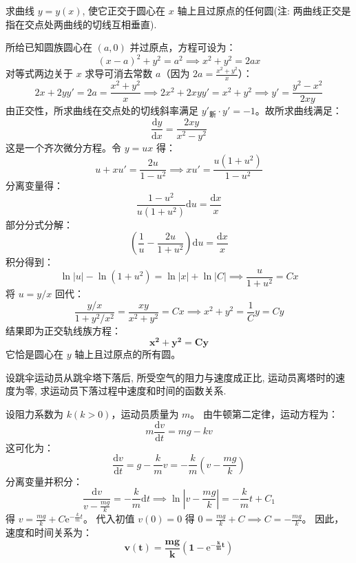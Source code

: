 \documentclass[lang=cn,11pt]{elegantbook}
\begin{document}
\begin{exercise}[求解曲线]
求曲线 $y=y(x)$, 使它正交于圆心在 $x$ 轴上且过原点的任何圆(注: 两曲线正交是指在交点处两曲线的切线互相垂直).
\end{exercise}
\begin{solution}
所给已知圆族圆心在 $(a,0)$ 并过原点，方程可设为：
\[
(x-a)^2 + y^2 = a^2 \implies x^2+y^2 = 2ax
\]
对等式两边关于 $x$ 求导可消去常数 $a$（因为 $2a = \frac{x^2+y^2}{x}$）：
\[
2x + 2yy' = 2a = \frac{x^2+y^2}{x} \implies 2x^2 + 2xyy' = x^2+y^2 \implies y' = \frac{y^2-x^2}{2xy}
\]
由正交性，所求曲线在交点处的切线斜率满足 $y'_{\text{新}} \cdot y' = -1$。故所求曲线满足：
\[
\frac{\mathrm{d}y}{\mathrm{d}x} = \frac{2xy}{x^2-y^2}
\]
这是一个齐次微分方程。令 $y = ux$ 得：
\[
u+xu' = \frac{2u}{1-u^2} \implies xu' = \frac{u(1+u^2)}{1-u^2}
\]
分离变量得：
\[
\frac{1-u^2}{u(1+u^2)}\mathrm{d}u = \frac{\mathrm{d}x}{x}
\]
部分分式分解：
\[
\left(\frac{1}{u} - \frac{2u}{1+u^2}\right)\mathrm{d}u = \frac{\mathrm{d}x}{x}
\]
积分得到：
\[
\ln|u| - \ln(1+u^2) = \ln|x| + \ln|C| \implies \frac{u}{1+u^2} = Cx
\]
将 $u=y/x$ 回代：
\[
\frac{y/x}{1+y^2/x^2} = \frac{xy}{x^2+y^2} = Cx \implies x^2+y^2 = \frac{1}{C}y = Cy
\]
结果即为正交轨线族方程：
\[
\mathbf{x^2+y^2=Cy}
\]
它恰是圆心在 $y$ 轴上且过原点的所有圆。
\end{solution}

\begin{exercise}[落体问题] 
    设跳伞运动员从跳伞塔下落后, 所受空气的阻力与速度成正比, 运动员离塔时的速度为零, 求运动员下落过程中速度和时间的函数关系.
\end{exercise}
\begin{solution}
设阻力系数为 $k(k>0)$，运动员质量为 $m$。
由牛顿第二定律，运动方程为：
\[
m\frac{\mathrm{d}v}{\mathrm{d}t} = mg - kv
\]
这可化为：
\[
\frac{\mathrm{d}v}{\mathrm{d}t} = g - \frac{k}{m}v = -\frac{k}{m}\left(v - \frac{mg}{k}\right)
\]
分离变量并积分：
\[
\frac{\mathrm{d}v}{v-\frac{mg}{k}} = -\frac{k}{m}\mathrm{d}t \implies \ln\left|v-\frac{mg}{k}\right| = -\frac{k}{m}t + C_1
\]
得 $v = \frac{mg}{k} + C\mathrm{e}^{-\frac{k}{m}t}$。
代入初值 $v(0)=0$ 得 $0 = \frac{mg}{k} + C \implies C = -\frac{mg}{k}$。
因此，速度和时间关系为：
\[
\mathbf{v(t) = \frac{mg}{k}\left(1 - \mathrm{e}^{-\frac{k}{m}t}\right)}
\]
\end{solution}
\end{document}
